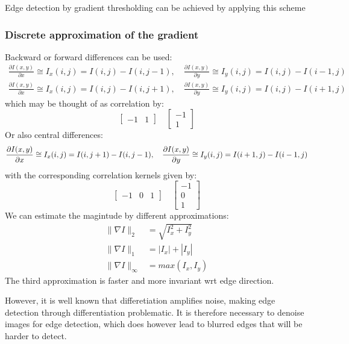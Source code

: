 \documentclass{article}
\begin{document}
Edge detection by gradient thresholding can be achieved by applying this scheme 
\subsubsection{Discrete approximation of the gradient}
Backward or forward differences can be used:
\begin{gather*}
    \displaystyle\frac{\partial I(x,y)}{\partial x} \cong I_x(i,j)=I(i,j)-I(i,j-1), \quad     \displaystyle\frac{\partial I(x,y)}{\partial y} \cong I_y(i,j)=I(i,j)-I(i-1,j)\\
    \displaystyle\frac{\partial I(x,y)}{\partial x} \cong I_x(i,j)=I(i,j)-I(i,j+1), \quad     \displaystyle\frac{\partial I(x,y)}{\partial y} \cong I_y(i,j)=I(i,j)-I(i+1,j)
\end{gather*}
which may be thought of as correlation by:
\[
    \begin{bmatrix}
        -1 & 1
    \end{bmatrix}\quad
    \begin{bmatrix}
        -1 \\ 1
    \end{bmatrix}
\]
Or also central differences:
\[
    \displaystyle\frac{\partial I(x,y)}{\partial x} \cong I_x(i,j)=I(i,j+1)-I(i,j-1), \quad     \displaystyle\frac{\partial I(x,y)}{\partial y} \cong I_y(i,j)=I(i+1,j)-I(i-1,j)\\
\]
with the corresponding correlation kernels given by:
\[
    \begin{bmatrix}
        -1 & 0 & 1
    \end{bmatrix}\quad
    \begin{bmatrix}
        -1 \\ 0 \\ 1
    \end{bmatrix}
\]
We can estimate the magintude by different approximations:
\begin{align*}
    \|\nabla I\|_2&=\sqrt{I_x^2+I_y^2} \\ \|\nabla I \|_1 &= |I_x| + |I_y| \\ \|\nabla I \|_\infty &= max(I_x,I_y) \end{align*}
The third approximation is faster and more invariant wrt edge direction. 

However, it is well known that differetiation amplifies noise, making edge detection through differentiation problematic. It is therefore necessary to denoise images for edge detection, which does however lead to blurred edges that will be harder to detect. 
\end{document}
